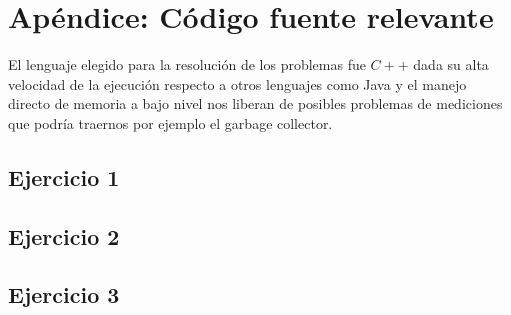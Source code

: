 \section{Ap\'endice: C\'odigo fuente relevante}
El lenguaje elegido para la resoluci\'on de los problemas fue $C++$ dada su alta velocidad de la ejecuci\'on respecto a otros lenguajes como Java y el manejo directo de memoria a bajo nivel nos liberan de posibles problemas de mediciones que podr\'ia traernos por ejemplo el garbage collector.
\subsection{Ejercicio 1} \label{codigo_1}

\newpage

\subsection{Ejercicio 2} \label{codigo_2}

\newpage

\subsection{Ejercicio 3} \label{codigo_3}

\newpage
